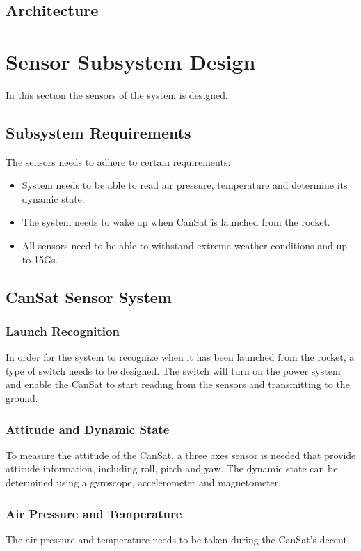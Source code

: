 \subsection{Architecture}

\newpage

\section{Sensor Subsystem Design}
In this section the sensors of the system is designed.
\subsection{Subsystem Requirements}
The sensors needs to adhere to certain requirements:
\begin{itemize}
    \item System needs to be able to read air pressure, temperature and determine its dynamic state.
    \item The system needs to wake up when CanSat is launched from the rocket.
    \item All sensors need to be able to withstand extreme weather conditions and up to 15Gs.
\end{itemize}
\subsection{CanSat Sensor System}
\subsubsection{Launch Recognition}
In order for the system to recognize when it has been launched from the rocket, a type of switch needs to be designed.   The switch will turn on the power system and enable the CanSat to start reading from the sensors and transmitting to the ground.
\subsubsection{Attitude and Dynamic State}
To measure the attitude of the CanSat, a three axes sensor is needed that provide attitude information, including roll, pitch and yaw.  The dynamic state can be determined using a gyroscope, accelerometer and magnetometer. 
\subsubsection{Air Pressure and Temperature}
The air pressure and temperature needs to be taken during the CanSat's decent.  
